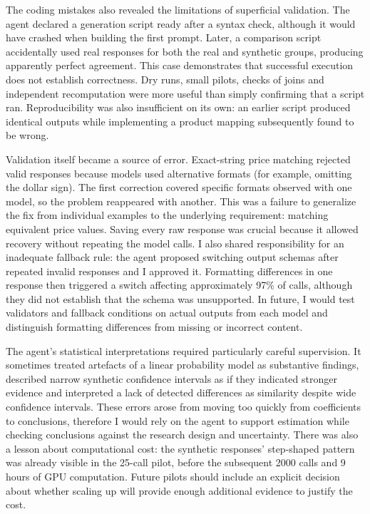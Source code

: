 \documentclass[11pt,a4paper]{article}
\begin{document}
The coding mistakes also revealed the limitations of superficial validation. The agent declared a generation script ready after a syntax check, although it would have crashed when building the first prompt. Later, a comparison script accidentally used real responses for both the real and synthetic groups, producing apparently perfect agreement. This case demonstrates that successful execution does not establish correctness. Dry runs, small pilots, checks of joins and independent recomputation were more useful than simply confirming that a script ran. Reproducibility was also insufficient on its own: an earlier script produced identical outputs while implementing a product mapping subsequently found to be wrong.

Validation itself became a source of error. Exact-string price matching rejected valid responses because models used alternative formats (for example, omitting the dollar sign). The first correction covered specific formats observed with one model, so the problem reappeared with another. This was a failure to generalize the fix from individual examples to the underlying requirement: matching equivalent price values. Saving every raw response was crucial because it allowed recovery without repeating the model calls. I also shared responsibility for an inadequate fallback rule: the agent proposed switching output schemas after repeated invalid responses and I approved it. Formatting differences in one response then triggered a switch affecting approximately 97\% of calls, although they did not establish that the schema was unsupported. In future, I would test validators and fallback conditions on actual outputs from each model and distinguish formatting differences from missing or incorrect content.

The agent's statistical interpretations required particularly careful supervision. It sometimes treated artefacts of a linear probability model as substantive findings, described narrow synthetic confidence intervals as if they indicated stronger evidence and interpreted a lack of detected differences as similarity despite wide confidence intervals. These errors arose from moving too quickly from coefficients to conclusions, therefore I would rely on the agent to support estimation while checking conclusions against the research design and uncertainty. There was also a lesson about computational cost: the synthetic responses' step-shaped pattern was already visible in the 25-call pilot, before the subsequent 2000 calls and 9 hours of GPU computation. Future pilots should include an explicit decision about whether scaling up will provide enough additional evidence to justify the cost.
\end{document}
